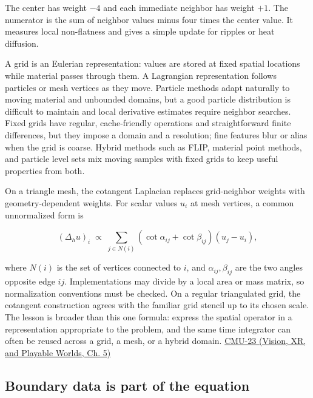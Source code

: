 The center has weight \(-4\) and each immediate neighbor has weight \(+1\). The numerator is the sum of neighbor values minus four times the center value. It measures local non-flatness and gives a simple update for ripples or heat diffusion.

A grid is an Eulerian representation: values are stored at fixed spatial locations while material passes through them. A Lagrangian representation follows particles or mesh vertices as they move. Particle methods adapt naturally to moving material and unbounded domains, but a good particle distribution is difficult to maintain and local derivative estimates require neighbor searches. Fixed grids have regular, cache-friendly operations and straightforward finite differences, but they impose a domain and a resolution; fine features blur or alias when the grid is coarse. Hybrid methods such as FLIP, material point methods, and particle level sets mix moving samples with fixed grids to keep useful properties from both.

On a triangle mesh, the cotangent Laplacian replaces grid-neighbor weights with geometry-dependent weights. For scalar values \(u_i\) at mesh vertices, a common unnormalized form is

\[
(\Delta_h u)_i\;\propto\;\sum_{j\in N(i)}(\cot\alpha_{ij}+\cot\beta_{ij})(u_j-u_i),
\]

where \(N(i)\) is the set of vertices connected to \(i\), and \(\alpha_{ij},\beta_{ij}\) are the two angles opposite edge \(ij\). Implementations may divide by a local area or mass matrix, so normalization conventions must be checked. On a regular triangulated grid, the cotangent construction agrees with the familiar grid stencil up to its chosen scale. The lesson is broader than this one formula: express the spatial operator in a representation appropriate to the problem, and the same time integrator can often be reused across a grid, a mesh, or a hybrid domain. \href{../07-Vision-XR-and-Playable-Worlds/main.pdf\#nameddest=04-visual-computing-ii-ch036-cmu-23---physically-based-animation-and-pdes}{CMU-23 (Vision, XR, and Playable Worlds, Ch. 5)}

\subsection{Boundary data is part of the equation}\label{04-visual-computing-ii-ch030-boundary-data-is-part-of-the-equation}

\hypertarget{04-visual-computing-ii-ch030-boundary-data-is-part-of-the-equation}{}

